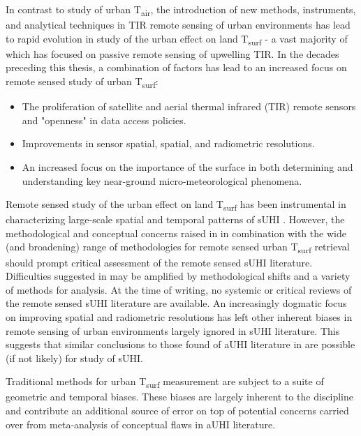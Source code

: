 In contrast to study of urban T\textsubscript{air}, the introduction of new methods, instruments, and analytical techniques in TIR remote sensing of urban environments has lead to rapid evolution in study of the urban effect on land T\textsubscript{surf} - a vast majority of which has focused on passive remote sensing of upwelling TIR. In the decades preceding this thesis, a combination of factors has lead to an increased focus on remote sensed study of urban T\textsubscript{surf}: 

\begin{itemize}
	\item The proliferation of satellite and aerial thermal infrared (TIR) remote sensors and "openness" in data access policies.
	\item Improvements in sensor spatial, spatial, and radiometric resolutions. 
	\item An increased focus on the importance of the surface in both determining and understanding key near-ground micro-meteorological phenomena.
\end{itemize}

Remote sensed study of the urban effect on land T\textsubscript{surf} has been instrumental in characterizing large-scale spatial and temporal patterns of sUHI \citep{Peng2012, Streutker2003, Imhoff2010}. However, the methodological and conceptual concerns raised in \citet{Stewart2011} in combination with the wide (and broadening) range of methodologies for remote sensed urban T\textsubscript{surf} retrieval should prompt critical assessment of the remote sensed sUHI literature. Difficulties suggested in \citet{Stewart2011} may be amplified by methodological shifts and a variety of methods for analysis. At the time of writing, no systemic or critical reviews of the remote sensed sUHI literature are available. An increasingly dogmatic focus on improving spatial and radiometric resolutions has left other inherent biases in remote sensing of urban environments largely ignored in sUHI literature. This suggests that similar conclusions to those found of aUHI literature in \citet{Stewart2011} are possible (if not likely) for study of sUHI. 

Traditional methods for urban T\textsubscript{surf} measurement are subject to a suite of geometric and temporal biases. These biases are largely inherent to the discipline and contribute an additional source of error on top of potential concerns carried over from meta-analysis of conceptual flaws in aUHI literature. 

